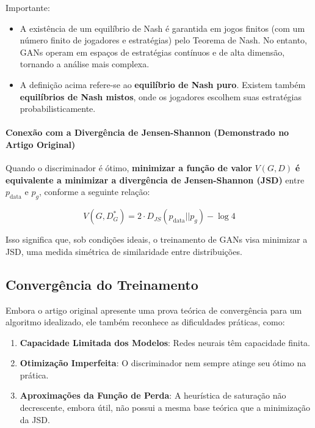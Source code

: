 \documentclass[a4paper]{tufte-handout}
\begin{document}
Importante:

\begin{itemize}
    \item A existência de um equilíbrio de Nash é garantida em jogos finitos (com um número finito de jogadores e estratégias) pelo Teorema de Nash. No entanto, GANs operam em espaços de estratégias contínuos e de alta dimensão, tornando a análise mais complexa.
    \item A definição acima refere-se ao \textbf{equilíbrio de Nash puro}. Existem também \textbf{equilíbrios de Nash mistos}, onde os jogadores escolhem suas estratégias probabilisticamente.
\end{itemize}
\paragraph{Conexão com a Divergência de Jensen-Shannon (Demonstrado no Artigo Original)}

Quando o discriminador é ótimo, \textbf{minimizar a função de valor} $V(G, D)$ \textbf{é equivalente a minimizar a divergência de Jensen-Shannon (JSD)} entre $p_{\text{data}}$ e $p_g$, conforme a seguinte relação:

\begin{equation*}
V(G, D^*_G) = 2 \cdot D_{JS}(p_{\text{data}} || p_g) - \log 4
\end{equation*}

Isso significa que, sob condições ideais, o treinamento de GANs visa minimizar a JSD, uma medida simétrica de similaridade entre distribuições.
\subsection{Convergência do Treinamento}

Embora o artigo original apresente uma prova teórica de convergência para um algoritmo idealizado, ele também reconhece as dificuldades práticas, como:

\begin{enumerate}
    \item \textbf{Capacidade Limitada dos Modelos}: Redes neurais têm capacidade finita.
    \item \textbf{Otimização Imperfeita}: O discriminador nem sempre atinge seu ótimo na prática.
    \item \textbf{Aproximações da Função de Perda}: A heurística de saturação não decrescente, embora útil, não possui a mesma base teórica que a minimização da JSD.
\end{enumerate}
\end{document}
